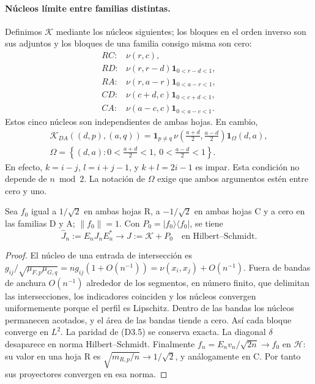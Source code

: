 \paragraph{Núcleos límite entre familias distintas.}
Definimos $\mathcal K$ mediante los núcleos siguientes; los bloques en el orden inverso
son sus adjuntos y los bloques de una familia consigo misma son cero:
\[
\begin{array}{ll}
 RC:&\nu(r,c),\\
 RD:&\nu(r,r-d)\mathbf1_{0<r-d<1},\\
 RA:&\nu(r,a-r)\mathbf1_{0<a-r<1},\\
 CD:&\nu(c+d,c)\mathbf1_{0<c+d<1},\\
 CA:&\nu(a-c,c)\mathbf1_{0<a-c<1}.
\end{array}                                             \tag{D3.4}
\]
Estos cinco núcleos son independientes de ambas hojas.
En cambio,
\[
 \begin{gathered}
 \mathcal K_{DA}((d,p),(a,q))
 =\mathbf1_{p\ne q}\,
   \nu\left(\frac{a+d}{2},\frac{a-d}{2}\right)\mathbf1_\Omega(d,a),\\
 \Omega=\left\{(d,a):0<\frac{a+d}{2}<1,\ 0<\frac{a-d}{2}<1\right\}.
 \end{gathered}                                         \tag{D3.5}
\]
En efecto, $k=i-j$, $l=i+j-1$, y $k+l=2i-1$ es impar.
Esta condición no depende de $n\bmod2$.
La notación de $\Omega$ exige que ambos argumentos estén entre cero y uno.

\begin{proposicion}
Sea $f_0$ igual a $1/\sqrt2$ en ambas hojas R, a $-1/\sqrt2$ en
ambas hojas C y a cero en las familias D y A; $\|f_0\|=1$.
Con $P_0=|f_0\rangle\langle f_0|$, se tiene
\[
 \widehat J_n:=E_nJ_nE_n^*\longrightarrow
             J:=\mathcal K+P_0\quad\text{en Hilbert--Schmidt}.       \tag{D3.6}
\]
\end{proposicion}
\begin{proof}
El núcleo de una entrada de intersección es
$g_{ij}/\sqrt{\mu_{F,p}\mu_{G,q}}=ng_{ij}(1+O(n^{-1}))
=\nu(x_i,x_j)+O(n^{-1})$.
Fuera de bandas de anchura $O(n^{-1})$ alrededor de los segmentos, en número finito,
que delimitan las intersecciones, los indicadores coinciden
y los núcleos convergen uniformemente porque el perfil es Lipschitz.
Dentro de las bandas los núcleos permanecen acotados, y el área de las bandas tiende a cero.
Así cada bloque converge en $L^2$. La paridad de (D3.5) se conserva exacta.
La diagonal $\delta$ desaparece en norma Hilbert--Schmidt.
Finalmente $f_n=E_nv_n/\sqrt{2n}\to f_0$ en $\mathcal H$:
su valor en una hoja R es $\sqrt{m_{R,p}/n}\to1/\sqrt2$,
y análogamente en C. Por tanto sus proyectores convergen en esa norma.
\end{proof}

